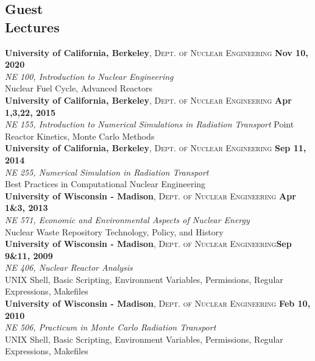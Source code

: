 \documentclass[margin,line]{resume}
\begin{document}
\begin{resume}
    \section{\mysidestyle Guest\\Lectures}
    \textbf{University of California, Berkeley}, \textsc{Dept. of Nuclear Engineering} \hfill  \hfill\textbf{Nov 10, 2020}\\
               \textsl{NE 100, Introduction to Nuclear Engineering}\\
               Nuclear Fuel Cycle, Advanced Reactors
               \vspace{2mm}\\
    \textbf{University of California, Berkeley}, \textsc{Dept. of Nuclear Engineering} \hfill \textbf{Apr 1,3,22, 2015}\\
               \textsl{NE 155, Introduction to Numerical Simulations in Radiation Transport}
               Point Reactor Kinetics, Monte Carlo Methods
               \vspace{2mm}\\
    \textbf{University of California, Berkeley}, \textsc{Dept. of Nuclear Engineering} \hfill \textbf{Sep 11, 2014}\\
               \textsl{NE 255, Numerical Simulation in Radiation Transport}\\
               Best Practices in Computational Nuclear Engineering
               \vspace{2mm}\\
    \textbf{University of Wisconsin - Madison}, \textsc{Dept. of Nuclear Engineering} \hfill \textbf{Apr 1\&3, 2013}\\
               \textsl{NE 571, Economic and Environmental Aspects of Nuclear Energy}\\
               Nuclear Waste Repository Technology, Policy, and History
               \vspace{2mm}\\
    \textbf{University of Wisconsin - Madison}, \textsc{Dept. of Nuclear Engineering}\hfill \textbf{Sep 9\&11, 2009}\\
               \textsl{NE 406, Nuclear Reactor Analysis}\\
               UNIX Shell, Basic Scripting, Environment Variables, Permissions, Regular Expressions, Makefiles
               \vspace{2mm}\\
    \textbf{University of Wisconsin - Madison}, \textsc{Dept. of Nuclear
    Engineering} \hfill \textbf{Feb 10, 2010}\\
               \textsl{NE 506, Practicum in Monte Carlo Radiation Transport}\\
               UNIX Shell, Basic Scripting, Environment Variables, Permissions, Regular Expressions, Makefiles
               \vspace{2mm}


\end{resume}
\end{document}
